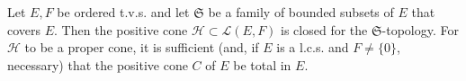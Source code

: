 Let $E, F$ be ordered t.v.s. and let $\mathfrak{S}$ be a family of bounded subsets of $E$ that covers $E$. Then the positive cone $\mathcal{H} \subset \mathcal{L}(E, F)$ is closed for the $\mathfrak{S}$-topology. For $\mathcal{H}$ to be a proper cone, it is sufficient (and, if $E$ is a l.c.s. and $F \neq \{0\}$, necessary) that the positive cone $C$ of $E$ be total in $E$.
